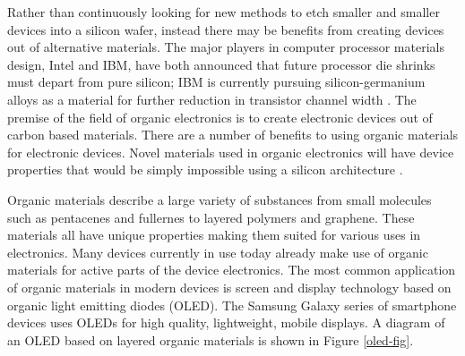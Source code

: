 Rather than continuously looking for new methods to etch smaller and smaller devices into a silicon wafer, instead there may be benefits from creating devices out of alternative materials. The major players in computer processor materials design, Intel and IBM, have both announced that future processor die shrinks must depart from pure silicon; IBM is currently pursuing silicon-germanium alloys as a material for further reduction in transistor channel width \cite{newyorktimesIBM}.  The premise of the field of organic electronics is to create electronic devices out of carbon based materials. There are a number of benefits to using organic materials for electronic devices. Novel materials used in organic electronics will have device properties that would be simply impossible using a silicon architecture \cite{cs3}.

Organic materials describe a large variety of substances from small molecules such as pentacenes and fullernes to layered polymers and graphene. These materials all have unique properties making them suited for various uses in electronics. Many devices currently in use today already make use of organic materials for active parts of the device electronics. The most common application of organic materials in modern devices is screen and display technology based on organic light emitting diodes (OLED). The Samsung Galaxy series of smartphone devices uses OLEDs for high quality, lightweight, mobile displays.  A diagram of an OLED based on layered organic materials is shown in Figure \ref{oled-fig}.


